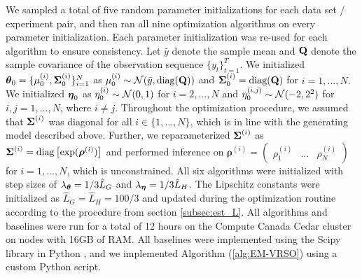 We sampled a total of five random parameter initializations for each data set / experiment pair, and then ran all nine optimization algorithms on every parameter initialization. Each parameter initialization was re-used for each algorithm to ensure consistency. Let $\bar y$ denote the sample mean and $\mathbf{Q}$ denote the sample covariance of the observation sequence $\{y_t\}_{t=1}^T$. We initialized $\boldsymbol{\theta}_0 = \{\mu^{(i)}_0,\boldsymbol{\Sigma}^{(i)}_0\}_{i=1}^N$ as
%
    $\mu^{(i)}_0 \sim \mathcal{N}(\bar y, \text{diag}(\mathbf{Q}))$ and $\boldsymbol{\Sigma}^{(i)}_0 = \text{diag}(\mathbf{Q})$ for $i = 1,\ldots,N.$ We initialized $\boldsymbol{\eta}_0$ as
    $\eta^{(i)}_0 \sim \mathcal{N}(0,1)$ for $i = 2,\ldots,N$ and
    $\eta^{(i,j)}_0 \sim \mathcal{N}(-2,2^2)$ for $i,j = 1,\ldots,N$, where $i \neq j$.
%
Throughout the optimization procedure, we assumed that $\boldsymbol{\Sigma}^{(i)}$ was diagonal for all $i \in \{1,\ldots,N\}$, which is in line with the generating model described above. Further, we reparameterized $\boldsymbol{\Sigma}^{(i)}$ as 
%
    $\boldsymbol{\Sigma}^{(i)} = \text{diag}\left[\exp(\boldsymbol{\rho}^{(i)})\right]$
%
and performed inference on $\boldsymbol{\rho}^{(i)} = \begin{pmatrix} \rho^{(i)}_1 & \ldots & \rho^{(i)}_N \end{pmatrix}$ for $i = 1,\ldots,N$, which is unconstrained.
All six algorithms were initialized with step sizes of $\lambda_{\boldsymbol{\theta}} = 1/3 \hat L_G$ and $\lambda_{\boldsymbol{\eta}} = 1/3 \hat L_H$. The Lipschitz constants were initialized as $\hat L_G = \hat L_H = 100/3$ and updated during the optimization routine according to the procedure from section \ref{subsec:est_L}. 
%
All algorithms and baselines were run for a total of 12 hours on the Compute Canada Cedar cluster on nodes with 16GB of RAM.
%
All baselines were implemented using the Scipy library in Python \citep{Virtanen:2019}, and we implemented Algorithm (\ref{alg:EM-VRSO}) using a custom Python script.

